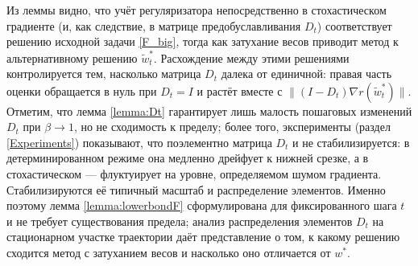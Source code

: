 Из леммы видно, что учёт регуляризатора непосредственно в стохастическом градиенте (и, как следствие, в матрице предобуславливания $D_t$) соответствует решению исходной задачи \eqref{F_big}, тогда как затухание весов приводит метод к альтернативному решению $\widetilde{w}^*_t$. Расхождение между этими решениями контролируется тем, насколько матрица $D_t$ далека от единичной: правая часть оценки обращается в нуль при $D_t = I$ и растёт вместе с $\|(I - D_t)\nabla r(\widetilde{w}^*_t)\|$.
Отметим, что лемма \ref{lemma:Dt} гарантирует лишь малость пошаговых изменений $D_t$ при $\beta \to 1$, но не сходимость к пределу; более того, эксперименты (раздел \ref{Experiments}) показывают, что поэлементно матрица $D_t$ и не стабилизируется: в детерминированном режиме она медленно дрейфует к нижней срезке, а в стохастическом --- флуктуирует на уровне, определяемом шумом градиента. Стабилизируются её типичный масштаб и распределение элементов. Именно поэтому лемма \ref{lemma:lowerbondF} сформулирована для фиксированного шага $t$ и не требует существования предела; анализ распределения элементов $D_t$ на стационарном участке траектории даёт представление о том, к какому решению сходится метод с затуханием весов и насколько оно отличается от $w^*$.
